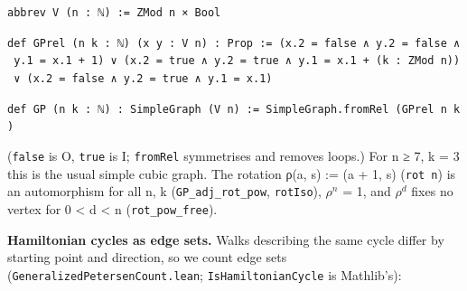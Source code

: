 \documentclass[11pt,a4paper]{article}
\theoremstyle{named}
\begin{document}
\begin{leancode}
\item \texttt{abbrev\ \allowbreak{}V\ \allowbreak{}(n\ \allowbreak{}:\ \allowbreak{}ℕ)\ \allowbreak{}:=\ \allowbreak{}ZMod\ \allowbreak{}n\ \allowbreak{}×\ \allowbreak{}Bool}
\item \texttt{def\ \allowbreak{}GPrel\ \allowbreak{}(n\ \allowbreak{}k\ \allowbreak{}:\ \allowbreak{}ℕ)\ \allowbreak{}(x\ \allowbreak{}y\ \allowbreak{}:\ \allowbreak{}V\ \allowbreak{}n)\ \allowbreak{}:\ \allowbreak{}Prop\ \allowbreak{}:=\ \allowbreak{}(x.\allowbreak{}2\ \allowbreak{}=\ \allowbreak{}false\ \allowbreak{}∧\ \allowbreak{}y.\allowbreak{}2\ \allowbreak{}=\ \allowbreak{}false\ \allowbreak{}∧\ \allowbreak{}y.\allowbreak{}1\ \allowbreak{}=\ \allowbreak{}x.\allowbreak{}1\ \allowbreak{}+\ \allowbreak{}1)\ \allowbreak{}∨\ \allowbreak{}(x.\allowbreak{}2\ \allowbreak{}=\ \allowbreak{}true\ \allowbreak{}∧\ \allowbreak{}y.\allowbreak{}2\ \allowbreak{}=\ \allowbreak{}true\ \allowbreak{}∧\ \allowbreak{}y.\allowbreak{}1\ \allowbreak{}=\ \allowbreak{}x.\allowbreak{}1\ \allowbreak{}+\ \allowbreak{}(k\ \allowbreak{}:\ \allowbreak{}ZMod\ \allowbreak{}n))\ \allowbreak{}∨\ \allowbreak{}(x.\allowbreak{}2\ \allowbreak{}=\ \allowbreak{}false\ \allowbreak{}∧\ \allowbreak{}y.\allowbreak{}2\ \allowbreak{}=\ \allowbreak{}true\ \allowbreak{}∧\ \allowbreak{}y.\allowbreak{}1\ \allowbreak{}=\ \allowbreak{}x.\allowbreak{}1)}
\item \texttt{def\ \allowbreak{}GP\ \allowbreak{}(n\ \allowbreak{}k\ \allowbreak{}:\ \allowbreak{}ℕ)\ \allowbreak{}:\ \allowbreak{}SimpleGraph\ \allowbreak{}(V\ \allowbreak{}n)\ \allowbreak{}:=\ \allowbreak{}SimpleGraph.\allowbreak{}fromRel\ \allowbreak{}(GPrel\ \allowbreak{}n\ \allowbreak{}k)}
\end{leancode}
(\texttt{false} is O, \texttt{true} is I; \texttt{fromRel} symmetrises and removes loops.) For n ≥ 7, k = 3 this is the usual simple cubic graph. The rotation ρ(a, s) := (a + 1, s) (\texttt{rot\ \allowbreak{}n}) is an automorphism for all n, k (\texttt{GP\_\allowbreak{}adj\_\allowbreak{}rot\_\allowbreak{}pow}, \texttt{rotIso}), $ρ^n$ = 1, and $ρ^d$ fixes no vertex for 0 \textless{} d \textless{} n (\texttt{rot\_\allowbreak{}pow\_\allowbreak{}free}).

\textbf{Hamiltonian cycles as edge sets.} Walks describing the same cycle differ by starting point and direction, so we count edge sets (\texttt{GeneralizedPetersenCount.\allowbreak{}lean}; \texttt{IsHamiltonianCycle} is Mathlib's):
\end{document}
